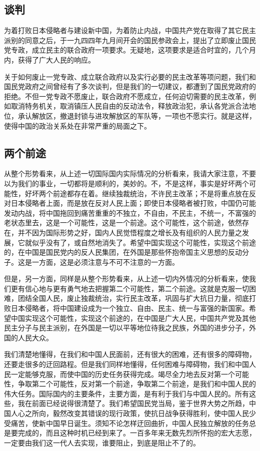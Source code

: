 \subsection{谈判}

为着打败日本侵略者与建设新中国，为着防止内战，中国共产党在取得了其它民主派别的同意之后，于一九四四年九月间开会的国民参政会上，提出了立即废止国民党专政，成立民主的联合政府一项要求。无疑地，这项要求是适合时宜的，几个月内，获得了广大人民的响应。

关于如何废止一党专政、成立联合政府以及实行必要的民主改革等项问题，我们和国民党政府之间曾经有了多次谈判，但是我们的一切建议，都遭到了国民党政府的拒绝。不但一党专政不愿废止，联合政府不愿成立，任何迫切需要的民主改革，例如取消特务机关，取消镇压人民自由的反动法令，释放政治犯，承认各党派合法地位，承认解放区，撤退封锁与进攻解放区的军队等，一项也不愿实行。就是这样，使得中国的政治关系处在非常严重的局面之下。

\subsection{两个前途}

从整个形势看来，从上述一切国际国内实际情况的分析看来，我请大家注意，不要以为我们的事业，一切都将是顺利的，美妙的。不，不是这样，事实是好坏两个可能性，好坏两个前途都存在着。继续独裁统治，不许民主改革；不是将重点放在反对日本侵略者上面，而是放在反对人民上面；即使日本侵略者被打败，中国仍可能发动内战，将中国拖回到痛苦重重的不独立，不自由，不民主，不统一，不富强的老状态里去，这是一个可能性，这是一个前途。这个可能性，这个前途，依然存在，并不因为国际形势之好，国内人民觉悟程度之增长及有组织的人民力量之发展，它就似乎没有了，或自然地消失了。希望中国实现这个可能性，实现这个前途的，在中国是国民党内的反人民集团，在外国是那些怀抱帝国主义思想的反动分子。这是一方面，这是必须注意与不可不注意的一方面。

但是，另一方面，同样是从整个形势看来，从上述一切内外情况的分析看来，使我们更有信心地与更有勇气地去把握第二个可能性，第二个前途。这就是克服一切困难，团结全国人民，废止独裁统治，实行民主改革，巩固与扩大抗日力量，彻底打败日本侵略者，将中国建设成为一个独立、自由、民主、统一与富强的新国家。希望中国实现这个可能性，实现这个前途的，在中国是广大人民，中国共产党及其他民主分子与民主派别，在外国是一切以平等地位待我之民族，外国的进步分子，外国的人民大众。

我们清楚地懂得，在我们和中国人民面前，还有很大的困难，还有很多的障碍物，还要走很多的迂回路程。但是我们同样地懂得，任何困难与障碍物，我们和中国人民一定能够克服，而使中国的历史任务获得完成。竭尽全力地去反对第一个可能性，争取第二个可能性，反对第一个前途，争取第二个前途，是我们和中国人民的伟大任务。国际国内的主要条件，主要方面，是有利于我们与中国人民的。所有这些，我在前面已经说得很清楚了。我们希望国民党当局，鉴于世界大势之所趋，中国人心之所向，毅然改变其错误的现行政策，使抗日战争获得胜利，使中国人民少受痛苦，使新中国早日诞生。须知不论怎样迂回曲折，中国人民独立解放的任务总是要完成的，而且这种时机已经到来了。一百多年来无数先烈所怀抱的宏大志愿，一定要由我们这一代人去实现，谁要阻止，到底是阻止不了的。

